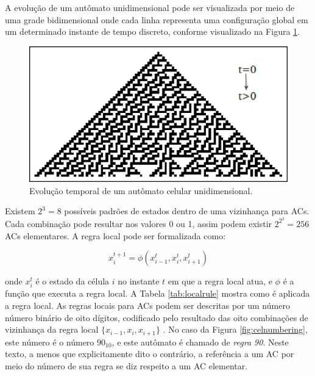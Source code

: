\documentclass[12pt,a4paper]{article}
\begin{document}
A evolução de um autômato unidimensional pode ser visualizada por meio de uma grade bidimensional
onde cada linha representa uma configuração global em um determinado instante de tempo discreto,
conforme visualizado na Figura \ref{fig:celautomaton}.

\begin{figure}[htp]
\begin{center}
\includegraphics[scale=0.8]{img/CellularAutomaton.eps}
\caption{Evolução temporal de um autômato celular unidimensional.}
\label{fig:celautomaton}
\end{center}
\end{figure}

Existem $2^3=8$ possíveis padrões de estados dentro de uma vizinhança para ACs.
Cada combinação pode resultar nos valores 0 ou 1, assim podem existir $2^{2^3}=256$ ACs
elementares. A regra local pode ser formalizada como:

\begin{equation}
x^{t+1}_i = \phi(x^t_{i-1}, x^t_i, x^t_{i+1})
\end{equation}

\hspace{1 mm} onde $x^t_i$ é o estado da célula $i$ no instante $t$ em que a
regra local atua, e $\phi$ é a função que executa a regra local.  A Tabela
\ref{tab:localrule} mostra como é aplicada a regra local.  As regras locais
para ACs podem ser descritas por um número número binário de oito dígitos,
codificado pelo resultado das oito combinações de vizinhança da regra local
$\{x_{i-1},x_i,x_{i+1}\}$ . No caso da Figura
\ref{fig:celnumbering}, este número é o número $90_{10}$, e este autômato
é chamado de \textit{regra 90}. Neste texto, a menos que explicitamente
dito o contrário, a referência a um AC por meio do número de sua regra se
diz respeito a um AC elementar.
\end{document}
